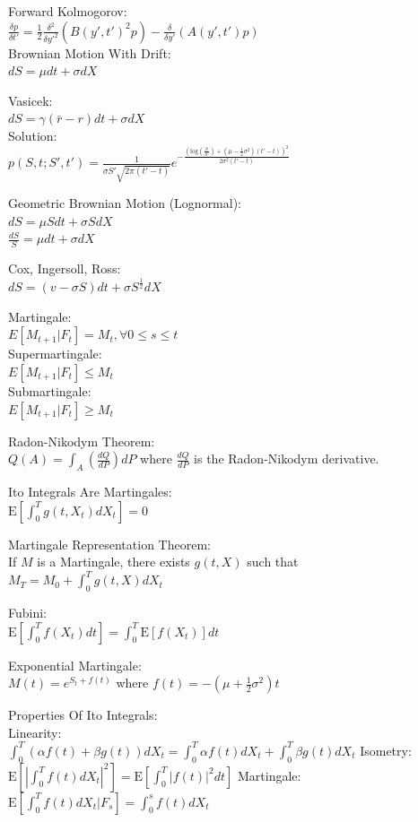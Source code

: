 Forward Kolmogorov: \\
$\frac{\delta p}{\delta t'} = \frac{1}{2} \frac{\delta^2}{\delta y'^2} (B(y',t')^2 p) - \frac{\delta}{\delta y'} (A(y',t') p)$ \\

Brownian Motion With Drift: \\
$dS=\mu dt+\sigma dX$

Vasicek: \\
$dS=\gamma (\bar{r}-r)dt+\sigma dX$ \\
Solution: \\
$p(S,t;S',t')=\frac{1}{\sigma S' \sqrt{2\pi(t'-t)}} e^{-\frac{(\text{log} \left( \frac{S}{S'} \right)+(\mu - \frac{1}{2} \sigma^2)(t'-t) )^2}{2 \sigma^2 (t'-t)}}$

Geometric Brownian Motion (Lognormal): \\
$dS=\mu S dt+\sigma S dX$ \\
$\frac{dS}{S} = \mu dt + \sigma dX$

Cox, Ingersoll, Ross: \\
$dS=(v-\sigma S)dt+\sigma S^{\frac{1}{2}} dX$

Martingale: \\
$E[M_{t+1}|F_t]=M_t, \forall 0\le s\le t$ \\
Supermartingale: \\
$E[M_{t+1}|F_t]\le M_t$ \\
Submartingale: \\
$E[M_{t+1}|F_t]\ge M_t$

Radon-Nikodym Theorem: \\
$Q(A)=\int_A \left(\frac{dQ}{dP} \right) dP$ where $\frac{dQ}{dP}$ is the Radon-Nikodym derivative.

Ito Integrals Are Martingales: \\
$\text{E}\left[\int_0^T g(t,X_t)dX_t \right]=0$

Martingale Representation Theorem: \\
If $M$ is a Martingale, there exists $g(t,X)$ such that \\
$M_T=M_0+\int_0^T g(t,X)dX_t$

Fubini: \\
$\text{E}\left[\int_0^T f(X_t) dt \right]=\int_0^T \text{E}[f(X_t)]dt$

Exponential Martingale: \\
$M(t)=e^{S_t+f(t)}$ where $f(t)=-(\mu + \frac{1}{2} \sigma^2)t$

Properties Of Ito Integrals: \\
Linearity: \\
$\int_0^T (\alpha f(t)+\beta g(t)) dX_t=\int_0^T \alpha f(t) dX_t + \int_0^T \beta g(t) dX_t$
Isometry: \\
$\text{E}\left[ | \int_0^T f(t) dX_t |^2 \right]=\text{E}\left[\int_0^T |f(t)|^2 dt \right]$
Martingale: \\
$\text{E}\left[\int_0^T f(t) dX_t | F_s \right]=\int_0^s f(t) dX_t$

